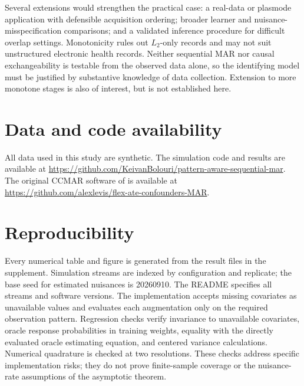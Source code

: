 \documentclass[11pt]{article}
\theoremstyle{definition}
\newcommand{\1}{\mathbf{1}}
\begin{document}
Several extensions would strengthen the practical case: a real-data or plasmode application with defensible acquisition ordering; broader learner and nuisance-misspecification comparisons; and a validated inference procedure for difficult overlap settings. Monotonicity rules out $L_2$-only records and may not suit unstructured electronic health records. Neither sequential MAR nor causal exchangeability is testable from the observed data alone, so the identifying model must be justified by substantive knowledge of data collection. Extension to more monotone stages is also of interest, but is not established here.

\section*{Data and code availability}

All data used in this study are synthetic. The simulation code and results are available at
\url{https://github.com/KeivanBolouri/pattern-aware-sequential-mar}.
The original CCMAR software of \citet{levis2025} is available at
\url{https://github.com/alexlevis/flex-ate-confounders-MAR}.

\section*{Reproducibility}

Every numerical table and figure is generated from the result files in the supplement. Simulation streams are indexed by configuration and replicate; the base seed for estimated nuisances is 20260910. The README specifies all streams and software versions. The implementation accepts missing covariates as unavailable values and evaluates each augmentation only on the required observation pattern. Regression checks verify invariance to unavailable covariates, oracle response probabilities in training weights, equality with the directly evaluated oracle estimating equation, and centered variance calculations. Numerical quadrature is checked at two resolutions. These checks address specific implementation risks; they do not prove finite-sample coverage or the nuisance-rate assumptions of the asymptotic theorem.
\end{document}
